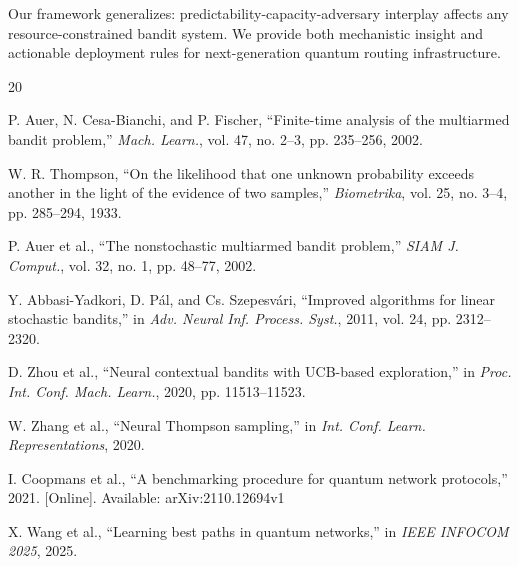 \documentclass[10pt,twocolumn,journal]{IEEEtran}
\begin{document}
Our framework generalizes: predictability-capacity-adversary interplay affects any resource-constrained bandit system. We provide both mechanistic insight and actionable deployment rules for next-generation quantum routing infrastructure.

\begin{thebibliography}{20}

 P. Auer, N. Cesa-Bianchi, and P. Fischer, ``Finite-time analysis of the multiarmed bandit problem,'' \textit{Mach. Learn.}, vol. 47, no. 2--3, pp. 235--256, 2002.

 W. R. Thompson, ``On the likelihood that one unknown probability exceeds another in the light of the evidence of two samples,'' \textit{Biometrika}, vol. 25, no. 3--4, pp. 285--294, 1933.

 P. Auer et al., ``The nonstochastic multiarmed bandit problem,'' \textit{SIAM J. Comput.}, vol. 32, no. 1, pp. 48--77, 2002.

 Y. Abbasi-Yadkori, D. Pál, and Cs. Szepesvári, ``Improved algorithms for linear stochastic bandits,'' in \textit{Adv. Neural Inf. Process. Syst.}, 2011, vol. 24, pp. 2312--2320.

 D. Zhou et al., ``Neural contextual bandits with UCB-based exploration,'' in \textit{Proc. Int. Conf. Mach. Learn.}, 2020, pp. 11513--11523.

 W. Zhang et al., ``Neural Thompson sampling,'' in \textit{Int. Conf. Learn. Representations}, 2020.

 I. Coopmans et al., ``A benchmarking procedure for quantum network protocols,'' 2021. [Online]. Available: arXiv:2110.12694v1

 X. Wang et al., ``Learning best paths in quantum networks,'' in \textit{IEEE INFOCOM 2025}, 2025.

\end{thebibliography}
\end{document}
